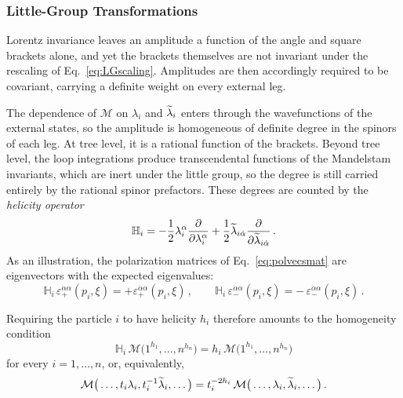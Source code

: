 \subsubsection{Little-Group Transformations}

Lorentz invariance leaves an amplitude a function of the angle and square brackets alone, and yet
the brackets themselves are not invariant under the rescaling of Eq.~\eqref{eq:LGscaling}.
Amplitudes are then
accordingly required to be covariant, carrying a definite weight on every external leg.

The dependence of $\mathcal M$ on $\lambda_i$ and $\widetilde{\lambda}_i$ enters through the
wavefunctions of the external states, so the amplitude is homogeneous of definite degree in the
spinors of each leg. At tree level, it is a rational function of the brackets. Beyond tree level, the
loop integrations produce transcendental functions of the Mandelstam invariants, which are inert
under the little group, so the degree is still carried entirely by the rational spinor
prefactors. These degrees are counted by the \textit{helicity operator}
\begin{equation}\label{eq:helicityop}
    \mathbb H_i = -\frac{1}{2}\lambda_i^\alpha \frac{\partial}{\partial \lambda_i^\alpha}
    + \frac{1}{2}\widetilde{\lambda}_{i\dot\alpha}\frac{\partial}{\partial \widetilde{\lambda}_{i\dot\alpha}}\,.
\end{equation}
%
As an illustration, the polarization matrices of Eq.~\eqref{eq:polvecsmat} are eigenvectors with the expected eigenvalues:
\begin{equation}
    \mathbb H_i\,\varepsilon_{+}^{\dot\alpha\alpha}(p_i,\xi) = +\varepsilon_{+}^{\dot\alpha\alpha}(p_i,\xi)\,,
    \qquad
    \mathbb H_i\,\varepsilon_{-}^{\dot\alpha\alpha}(p_i,\xi) = -\,\varepsilon_{-}^{\dot\alpha\alpha}(p_i,\xi)\,.
\end{equation}

Requiring the particle $i$ to have helicity $h_i$ therefore amounts to the homogeneity condition
\begin{equation}
    \mathbb H_i\,\mathcal M\big(1^{h_1},\dotsc,n^{h_n}\big) = h_i\,\mathcal M\big(1^{h_1},\dotsc,n^{h_n}\big)
\end{equation}
for every $i=1,\dotsc,n$, or, equivalently,
\begin{equation}\label{eq:LGweight}
    \mathcal M\big(\dotsc,t_i\lambda_i,t_i^{-1}\widetilde{\lambda}_i,\dotsc\big)
    = t_i^{-2h_i}\,\mathcal M\big(\dotsc,\lambda_i,\widetilde{\lambda}_i,\dotsc\big)\,.
\end{equation}



